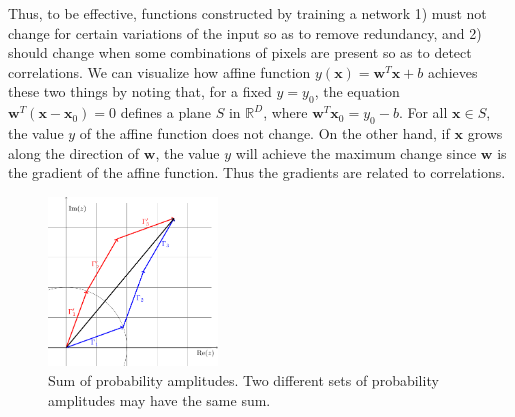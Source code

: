\documentclass{article}
\begin{document}
Thus, to be effective, functions constructed by training a network 1) must
not change for certain variations of the input so as to remove redundancy,
and 2) should change when some combinations of pixels are present so as to
detect correlations. We can visualize how affine function
\(y(\mathbf{x}) = \mathbf{w}^{T}\mathbf{x} + b\) achieves these two things
by noting that, for a fixed \(y = y_{0}\), the equation
\(\mathbf{w}^{T}(\mathbf{x} - \mathbf{x}_{0})= 0\) defines a plane \(S\) in
\(\mathbb{R}^{D}\), where \(\mathbf{w}^{T}\mathbf{x}_{0} = y_{0} - b\). For
all \(\mathbf{x} \in S\), the value \(y\) of the affine function does not
change. On the other hand, if \(\mathbf{x}\) grows along the direction of
\(\mathbf{w}\), the value \(y\) will achieve the maximum change since
\(\mathbf{w}\) is the gradient of the affine function. Thus the gradients
are related to correlations.

\begin{figure}[htb]
  \centering
  \includegraphics[width=0.4\textwidth]{sum}
  \caption{Sum of probability amplitudes. Two different sets of probability
    amplitudes may have the same sum.}
  \label{fig:sum}
\end{figure}
\end{document}
